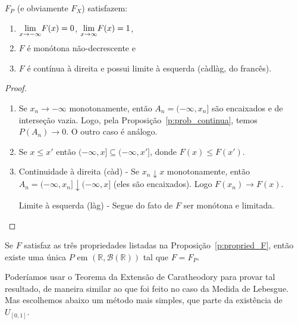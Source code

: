 \begin{proposition}
  \label{p:propried_F}
  $F_P$ (e obviamente $F_X$) satisfazem:
  \begin{enumerate}[\quad a)]
  \item $\smash{\lim\limits_{x \to -\infty}} F(x) = 0$, $\smash{\lim\limits_{x \to \infty}} F(x) = 1$,
  \item $F$ é monótona não-decrescente e
  \item $F$ é contínua à direita e possui limite à esquerda (càdlàg, do francês). 
  \end{enumerate}
\end{proposition}

\begin{proof}
  \begin{enumerate}[\quad a)]
  \item Se $x_n \to -\infty$ monotonamente, então $A_n = (-\infty, x_n]$ são encaixados e de interseção vazia.
    Logo, pela Proposição~\ref{p:prob_continua}, temos $P(A_n) \to 0$.
    O outro caso é análogo.
  \item Se $x \leq x'$ então $(-\infty, x] \subseteq (-\infty,x']$, donde $F(x) \leq F(x')$.
  \item Continuidade à direita (càd) - Se $x_n \downarrow x$ monotonamente, então $A_n = (-\infty, x_n] \downarrow (-\infty, x]$ (eles são encaixados).
    Logo $F(x_n) \to F(x)$.

    Limite à esquerda (làg) - Segue do fato de $F$ ser monótona e limitada. \qedhere
  \end{enumerate}
\end{proof}

\begin{theorem}
  \label{t:existe_prob_R}
  Se $F$ satisfaz as três propriedades listadas na Proposição~\ref{p:propried_F}, então existe uma única $P$ em $(\mathbb{R}, \mathcal{B}(\mathbb{R}))$ tal que $F = F_P$.
\end{theorem}

Poderíamos usar o Teorema da Extensão de Caratheodory para provar tal resultado, de maneira similar ao que foi feito no caso da Medida de Lebesgue.
Mas escolhemos abaixo um método mais simples, que parte da existência de $U_{[0,1]}$.

